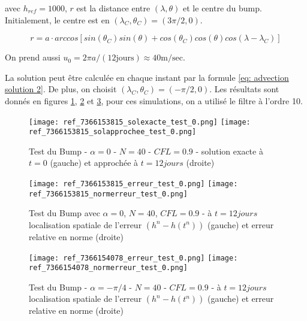 avec $h_{ref}=1000$, $r$ est la distance entre $(\lambda, \theta)$ et le centre du bump. Initialement, le centre est en $(\lambda_C, \theta_C) = (3 \pi /2, 0)$.

\begin{equation}
r = a \cdot arccos \left[ sin ( \theta_C) sin( \theta) + cos( \theta_C) cos ( \theta) cos ( \lambda - \lambda_C ) \right]
\end{equation}

On prend aussi $u_0 = 2  \pi a / (12 \text{jours} )\approx 40 \text{m/sec}$.

La solution peut être calculée en chaque instant par la formule \eqref{eq: advection solution 2}. De plus, on choisit $(\lambda_C, \theta_C) = ( - \pi/2, 0)$. Les résultats sont donnés en figures \ref{table adv1}, \ref{table adv2} et \ref{table adv3}, pour ces simulations, on a utilisé le filtre à l'ordre 10.


\begin{figure}[ht]
\begin{center}
\texttt{[image: ref\_7366153815\_solexacte\_test\_0.png]}
\texttt{[image: ref\_7366153815\_solapprochee\_test\_0.png]}
\caption{Test du Bump - $\alpha = 0$ - $N=40$ - $CFL=0.9$ - solution exacte à $t=0$ (gauche) et approchée à $t=12 jours$ (droite) }
\label{table adv1}
\end{center}
\end{figure}



\begin{figure}[ht]
\begin{center}
\texttt{[image: ref\_7366153815\_erreur\_test\_0.png]}
\texttt{[image: ref\_7366153815\_normerreur\_test\_0.png]}
\caption{Test du Bump avec $\alpha = 0$, $N=40$, $CFL=0.9$ - à $t=12 jours$ localisation spatiale de l'erreur $( h^n - h(t^n) )$ (gauche) et erreur relative en norme (droite) }
\label{table adv2}
\end{center}
\end{figure}



\begin{figure}[ht]
\begin{center}
\texttt{[image: ref\_7366154078\_erreur\_test\_0.png]}
\texttt{[image: ref\_7366154078\_normerreur\_test\_0.png]}
\caption{Test du Bump - $\alpha = - \pi /4$ - $N=40$ - $CFL=0.9$ - à $t=12 jours$ localisation spatiale de l'erreur $( h^n - h(t^n))$ (gauche) et erreur relative en norme (droite) }
\label{table adv3}
\end{center}
\end{figure}


